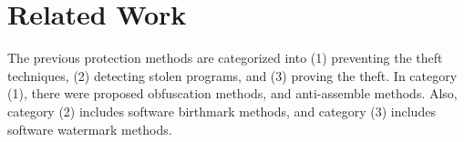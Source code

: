\documentclass[conference]{IEEEtran}
\begin{document}

\section{Related Work}\label{sect:relatedworks}

The previous protection methods are categorized into (1) preventing
the theft techniques, (2) detecting stolen programs, and (3) proving
the theft\cite{collberg09surreptitious}.
%
In category (1), there were proposed obfuscation methods, and
anti-assemble methods\cite{tyma00patent,monden97ieice}.  Also,
category (2) includes software birthmark
methods\cite{tamada05ieice}, and category (3) includes software
watermark methods\cite{collberg99popl}.
\end{document}
